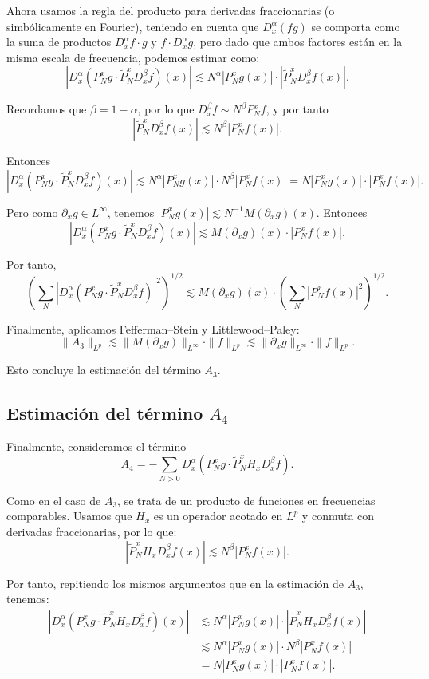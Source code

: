 \documentclass{aleph-revista}
\begin{document}
Ahora usamos la regla del producto para derivadas fraccionarias (o simb\'olicamente en Fourier), teniendo en cuenta que $D_x^\alpha (f g)$ se comporta como la suma de productos $D_x^\alpha f \cdot g$ y $f \cdot D_x^\alpha g$, pero dado que ambos factores est\'an en la misma escala de frecuencia, podemos estimar como:
\[
|D_x^\alpha (P_N^x g \cdot \widetilde{P}_N^x D_x^\beta f)(x)| \lesssim N^\alpha |P_N^x g(x)| \cdot |\widetilde{P}_N^x D_x^\beta f(x)|.
\]

Recordamos que $\beta = 1 - \alpha$, por lo que $D_x^\beta f \sim N^\beta P_N^x f$, y por tanto
\[
|\widetilde{P}_N^x D_x^\beta f(x)| \lesssim N^\beta |P_N^x f(x)|.
\]

Entonces
\[
|D_x^\alpha (P_N^x g \cdot \widetilde{P}_N^x D_x^\beta f)(x)| \lesssim N^\alpha |P_N^x g(x)| \cdot N^\beta |P_N^x f(x)| = N |P_N^x g(x)| \cdot |P_N^x f(x)|.
\]

Pero como $\partial_x g \in L^\infty$, tenemos $|P_N^x g(x)| \lesssim N^{-1} M(\partial_x g)(x)$. Entonces
\[
|D_x^\alpha (P_N^x g \cdot \widetilde{P}_N^x D_x^\beta f)(x)| \lesssim M(\partial_x g)(x) \cdot |P_N^x f(x)|.
\]

Por tanto,
\[
\left( \sum_{N} |D_x^\alpha (P_N^x g \cdot \widetilde{P}_N^x D_x^\beta f)|^2 \right)^{1/2} \lesssim M(\partial_x g)(x) \cdot \left( \sum_N |P_N^x f(x)|^2 \right)^{1/2}.
\]

Finalmente, aplicamos Fefferman--Stein y Littlewood--Paley:
\[
\|A_3\|_{L^p} \lesssim \|M(\partial_x g)\|_{L^\infty} \cdot \|f\|_{L^p} \lesssim \|\partial_x g\|_{L^\infty} \cdot \|f\|_{L^p}.
\]

Esto concluye la estimaci\'on del t\'ermino $A_3$.
\subsection*{Estimaci\'on del t\'ermino $A_4$}

Finalmente, consideramos el t\'ermino
\[
A_4 = - \sum_{N>0} D_x^\alpha (P_N^x g \cdot \widetilde{P}_N^x H_x D_x^\beta f).
\]

Como en el caso de $A_3$, se trata de un producto de funciones en frecuencias comparables. Usamos que $H_x$ es un operador acotado en $L^p$ y conmuta con derivadas fraccionarias, por lo que:
\[
|\widetilde{P}_N^x H_x D_x^\beta f(x)| \lesssim N^\beta |P_N^x f(x)|.
\]

Por tanto, repitiendo los mismos argumentos que en la estimaci\'on de $A_3$, tenemos:
\begin{align*}
|D_x^\alpha (P_N^x g \cdot \widetilde{P}_N^x H_x D_x^\beta f)(x)| &\lesssim N^\alpha |P_N^x g(x)| \cdot |\widetilde{P}_N^x H_x D_x^\beta f(x)| \\
&\lesssim N^\alpha |P_N^x g(x)| \cdot N^\beta |P_N^x f(x)| \\
&= N |P_N^x g(x)| \cdot |P_N^x f(x)|.
\end{align*}
\end{document}
